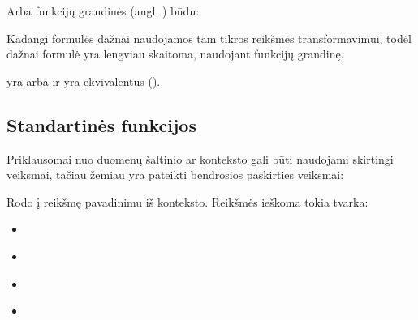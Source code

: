 \documentclass[letterpaper,10pt,lithuanian]{sphinxmanual}
\begin{document}
\sphinxAtStartPar
Arba funkcijų grandinės (angl. ) būdu:

\begin{sphinxVerbatim}[commandchars=\\\{\}]
\end{sphinxVerbatim}

\sphinxAtStartPar
Kadangi formulės dažnai naudojamos tam tikros reikšmės transformavimui, todėl
dažnai formulė yra lengviau skaitoma, naudojant funkcijų grandinę.

\sphinxAtStartPar
{} yra  arba  ir  yra ekvivalentūs
().


\subsection{Standartinės funkcijos}
\label{\detokenize{formules:module-func}}\label{\detokenize{formules:standartines-funkcijos}}
\sphinxAtStartPar
Priklausomai nuo duomenų šaltinio ar konteksto gali būti naudojami skirtingi
veiksmai, tačiau žemiau yra pateikti bendrosios paskirties veiksmai:

\begin{fulllineitems}
\label{\detokenize{formules:func.bind}}
\pysigstartsignatures
{}
\pysigstopsignatures
\sphinxAtStartPar
Rodo į reikšmę pavadinimu  iš konteksto. Reikšmės ieškoma tokia
tvarka:
\begin{itemize}
\item {} 
\sphinxAtStartPar
{\hyperref[\detokenize{formules:func.var}]{}}

\item {} 
\sphinxAtStartPar
{\hyperref[\detokenize{dimensijos:module-param}]{}}

\item {} 
\sphinxAtStartPar
{\hyperref[\detokenize{formules:func.item}]{}}

\item {} 
\sphinxAtStartPar
{\hyperref[\detokenize{formules:func.prop}]{}}

\end{itemize}

\end{fulllineitems}
\end{document}
